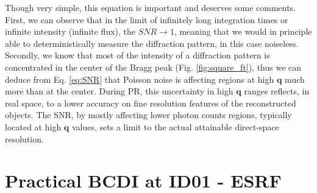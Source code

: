 Though very simple, this equation is important and deserves some comments.
First, we can observe that in the limit of infinitely long integration times or infinite intensity (infinite flux), 
the $SNR \rightarrow 1$, meaning that we would in principle able to deterministically measure the diffraction pattern, 
in this case noiseless. Secondly, we know that most of the intensity of a diffraction 
pattern is concentrated in the center of the Bragg peak (Fig. \ref{fig:square_ft}), thus we can deduce from Eq. \ref{eq:SNR} that Poisson 
noise is affecting regions at high $\mathbf{q}$ much more than at the center. During PR, this uncertainty in high $\mathbf{q}$ ranges 
reflects, in real space, to a lower accuracy on fine resolution features of the reconstructed objects. The SNR, by mostly 
affecting lower photon counts regions, typically located at high $\mathbf{q}$ values, sets a limit to the actual
attainable direct-space resolution.




\section{Practical BCDI at ID01 - ESRF }\label{chp:id01}

